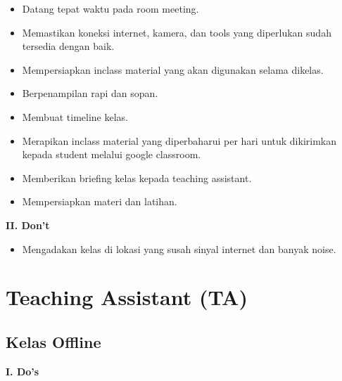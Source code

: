 \documentclass[
]{book}
\providecommand{\tightlist}{%
  \setlength{\itemsep}{0pt}\setlength{\parskip}{0pt}}
\begin{document}
\begin{itemize}
\tightlist
\item
  Datang tepat waktu pada room meeting.
\item
  Memastikan koneksi internet, kamera, dan tools yang diperlukan sudah tersedia dengan baik.
\item
  Mempersiapkan inclass material yang akan digunakan selama dikelas.
\item
  Berpenampilan rapi dan sopan.
\item
  Membuat timeline kelas.
\item
  Merapikan inclass material yang diperbaharui per hari untuk dikirimkan kepada student melalui google classroom.
\item
  Memberikan briefing kelas kepada teaching assistant.
\item
  Mempersiapkan materi dan latihan.
\end{itemize}

\textbf{II. Don't}

\begin{itemize}
\tightlist
\item
  Mengadakan kelas di lokasi yang susah sinyal internet dan banyak noise.
\end{itemize}

\hypertarget{teaching-assistant-ta}{%
\section{Teaching Assistant (TA)}\label{teaching-assistant-ta}}

\hypertarget{kelas-offline-4}{%
\subsection{Kelas Offline}\label{kelas-offline-4}}

\textbf{I. Do's}
\end{document}
